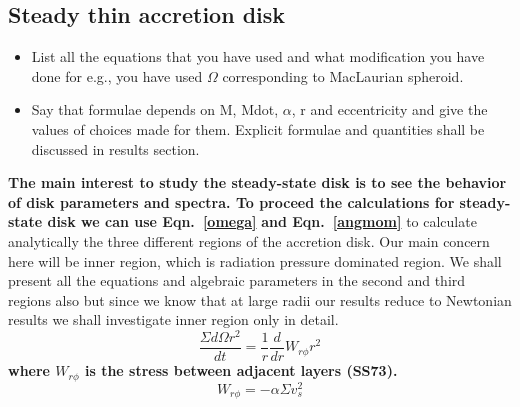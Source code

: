 \documentclass[useAMS,usenatbib]{mn2e}
\begin{document}
\subsection{Steady thin accretion disk}
\begin{itemize}
\item List all the equations that you have used and what modification
  you have done for e.g., you have used $\Omega$ corresponding to
  MacLaurian spheroid. 
\item Say that formulae depends on M, Mdot, $\alpha$, r and
  eccentricity and give the values of choices made for them. 
  Explicit formulae and quantities shall be discussed in results
  section.
\end{itemize}
\textbf{The main interest to study the steady-state disk is to see the behavior of disk parameters and spectra. To proceed the calculations for steady-state disk we can use Eqn.~\ref{omega}} \textbf{and Eqn.~\ref{angmom}} to calculate analytically the three different regions of the accretion disk. Our main concern here will be inner region, which is radiation pressure dominated region. We shall present all the equations and algebraic parameters in the second and third regions also but since we know that at large radii our results reduce to Newtonian results we shall investigate inner region only in detail.
\textbf{
\begin{equation}
\frac{\Sigma d\Omega r^2}{dt} = \frac{1}{r}\frac{d}{dr}W_{r\phi}r^2
\label{angmom}
\end{equation}
where $W_{r\phi}$ is the stress between adjacent layers (SS73).
\begin{equation}
W_{r\phi} = -\alpha\Sigma v_s^2
\end{equation}}
\end{document}
